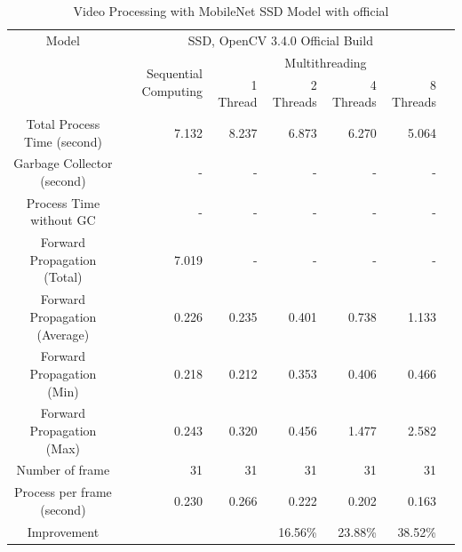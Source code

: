         \begin{table}[!htp]\centering
            \scriptsize
            \begin{tabular}{lrrrrrrr}\toprule
                \multicolumn{2}{c}{Model} &\multicolumn{5}{c}{SSD, OpenCV 3.4.0 Official Build} \\\cmidrule{1-7}
                \multicolumn{2}{c}{\multirow{2}{*}{}} &\multirow{2}{*}{Sequential Computing} &\multicolumn{4}{c}{Multithreading} \\\cmidrule{4-7}
                & & &1 Thread &2 Threads &4 Threads &8 Threads \\\midrule
                \multicolumn{2}{c}{Total Process Time (second)} &7.132 &8.237 &6.873 &6.270 &5.064 \\
                \multicolumn{2}{c}{Garbage Collector (second)} &- &- &- &- &- \\
                \multicolumn{2}{c}{Process Time without GC} &- &- &- &- &- \\
                \multicolumn{2}{c}{Forward Propagation (Total)} &7.019 &- &- &- &- \\
                \multicolumn{2}{c}{Forward Propagation (Average)} &0.226 &0.235 &0.401 &0.738 &1.133 \\
                \multicolumn{2}{c}{Forward Propagation (Min)} &0.218 &0.212 &0.353 &0.406 &0.466 \\
                \multicolumn{2}{c}{Forward Propagation (Max)} &0.243 &0.320 &0.456 &1.477 &2.582 \\
                \multicolumn{2}{c}{Number of frame} &31 &31 &31 &31 &31 \\
                \multicolumn{2}{c}{Process per frame (second)} &0.230 &0.266 &0.222 &0.202 &0.163 \\
                \multicolumn{2}{c}{Improvement} & & &16.56\% &23.88\% &38.52\% \\
                \bottomrule
            \end{tabular}

            \caption{Video Processing with MobileNet SSD Model with official}\label{ssd:official-performace}
        \end{table}

